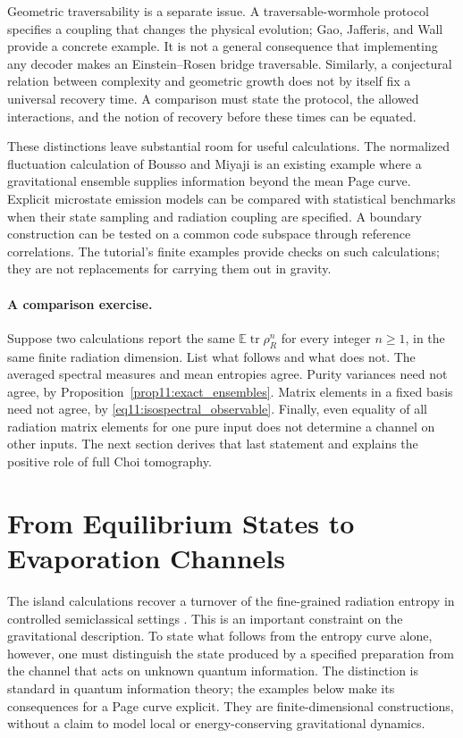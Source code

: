 \documentclass[11pt,letterpaper]{article}
\theoremstyle{plain}
\theoremstyle{definition}
\theoremstyle{remark}
\newcommand{\E}{\mathbb{E}}
\DeclareMathOperator{\tr}{tr}
\begin{document}
Geometric traversability is a separate issue. A traversable-wormhole
protocol specifies a coupling that changes the physical evolution;
Gao, Jafferis, and Wall provide a concrete example\citep{gaoetal2017}.
It is not a general consequence that implementing any decoder makes an
Einstein--Rosen bridge traversable. Similarly, a conjectural relation
between complexity and geometric growth does not by itself fix a
universal recovery time. A comparison must state the protocol, the
allowed interactions, and the notion of recovery before these times
can be equated.

These distinctions leave substantial room for useful calculations. The
normalized fluctuation calculation of Bousso and Miyaji is an existing
example where a gravitational ensemble supplies information beyond the
mean Page curve\citep{boussomiyaji2024}. Explicit microstate emission
models can be compared with statistical benchmarks when their state
sampling and radiation coupling are specified. A boundary construction
can be tested on a common code subspace through reference correlations.
The tutorial's finite examples provide checks on such calculations;
they are not replacements for carrying them out in gravity.

\paragraph{A comparison exercise.}
Suppose two calculations report the same $\E\tr\rho_R^n$ for every
integer $n\geq1$, in the same finite radiation dimension. List what
follows and what does not. The averaged spectral measures and mean
entropies agree. Purity variances need not agree, by
Proposition~\ref{prop11:exact_ensembles}. Matrix elements in a fixed
basis need not agree, by \eqref{eq11:isospectral_observable}. Finally,
even equality of all radiation matrix elements for one pure input does
not determine a channel on other inputs. The next section derives that
last statement and explains the positive role of full Choi tomography.

\section{From Equilibrium States to Evaporation Channels}
\label{sec14:equilibrium_evaporation}

The island calculations recover a turnover of the fine-grained radiation
entropy in controlled semiclassical settings
\citep{penington2020,almheirietal2019,almheirietal2020islands,pssyetal2022}.
This is an important constraint on the gravitational description. To state
what follows from the entropy curve alone, however, one must distinguish
the state produced by a specified preparation from the channel that acts
on unknown quantum information. The distinction is standard in quantum
information theory; the examples below make its consequences for a Page
curve explicit. They are finite-dimensional constructions, without a
claim to model local or energy-conserving gravitational dynamics.
\end{document}
